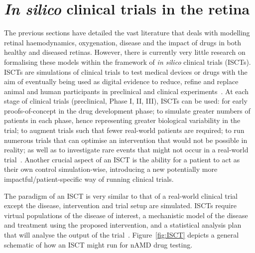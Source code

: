 \documentclass{article}
\begin{document}
\section{\textit{In silico} clinical trials in the retina}\label{sec:InSilicoTrials}

The previous sections have detailed the vast literature that deals with modelling retinal haemodynamics, oxygenation, disease and the impact of drugs in both healthy and diseased retinas. 
However, there is currently very little research on formalising these models within the framework of \textit{in silico} clinical trials (ISCTs). 
ISCTs are simulations of clinical trials to test medical devices or drugs with the aim of eventually being used as digital evidence to reduce, refine and replace animal and human participants in preclinical and clinical experiments~\cite{Viceconti2021a}. 
At each stage of clinical trials (preclinical, Phase I, II, III), ISCTs can be used: for early proofs-of-concept in the drug development phase; to simulate greater numbers of patients in each phase, hence representing greater biological variability in the trial; to augment trials such that fewer real-world patients are required; to run numerous trials that can optimise an intervention that would not be possible in reality; as well as to investigate rare events that might not occur in a real-world trial~\cite{Pappalardo2019, Viceconti_2016, Viceconti2017}. 
Another crucial aspect of an ISCT is the ability for a patient to act as their own control simulation-wise, introducing a new potentially more impactful/patient-specific way of running clinical trials.

The paradigm of an ISCT is very similar to that of a real-world clinical trial except the disease, intervention and trial setup are simulated. 
ISCTs require virtual populations of the disease of interest, a mechanistic model of the disease and treatment using the proposed intervention, and a statistical analysis plan that will analyse the output of the trial~\cite{Alfonso2020}. 
Figure~\ref{fig:ISCT} depicts a general schematic of how an ISCT might run for nAMD drug testing.
\end{document}
